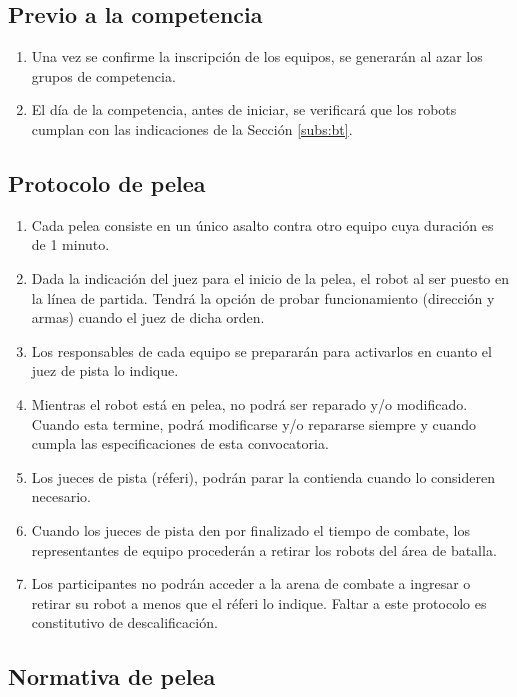 \documentclass[11pt]{article}
\begin{document}
\subsection{Previo a la competencia}
\begin{enumerate}
    \item Una vez se confirme la inscripción de los equipos, se generarán al azar los grupos de competencia.
    \item El día de la competencia, antes de iniciar, se verificará que los robots cumplan con las indicaciones de la Sección \ref{subs:bt}.
    
\end{enumerate}
\subsection{Protocolo de pelea}
\begin{enumerate}
    \item Cada pelea consiste en un único asalto contra otro equipo cuya duración es de 1 minuto. %
    \item Dada la indicación del juez para el inicio de la pelea, el robot al ser puesto en la línea de partida. Tendrá la opción de probar funcionamiento (dirección y armas) cuando el juez de dicha orden.
    \item Los responsables de cada equipo se prepararán para activarlos en cuanto el juez de pista lo indique. 
    \item Mientras el robot está en pelea, no podrá ser reparado y/o modificado. Cuando esta termine, podrá modificarse y/o repararse siempre y cuando cumpla las especificaciones de esta convocatoria.
    \item Los jueces de pista (réferi), podrán parar la contienda cuando lo consideren necesario.
    \item Cuando los jueces de pista den por finalizado el tiempo de combate, los representantes de equipo procederán a retirar los robots del área de batalla.
    \item Los participantes no podrán acceder a la arena de combate a ingresar o retirar su robot a menos que el réferi lo indique. Faltar a este protocolo es constitutivo de descalificación.
\end{enumerate}

\subsection{Normativa de pelea}
\end{document}
